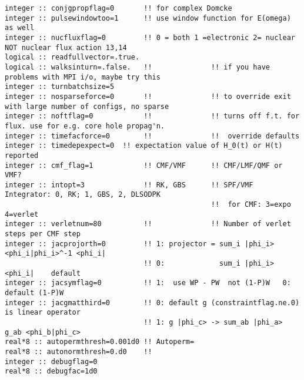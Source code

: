 \begin{verbatim}
integer :: conjgpropflag=0       !! for complex Domcke
integer :: pulsewindowtoo=1      !! use window function for E(omega) as well
integer :: nucfluxflag=0         !! 0 = both 1 =electronic 2= nuclear  NOT nuclear flux action 13,14
logical :: readfullvector=.true.
logical :: walksinturn=.false.   !!              !! if you have problems with MPI i/o, maybe try this
integer :: turnbatchsize=5
integer :: nosparseforce=0       !!              !! to override exit with large number of configs, no sparse
integer :: noftflag=0            !!              !! turns off f.t. for flux. use for e.g. core hole propag'n.
integer :: timefacforce=0        !!              !!  override defaults
integer :: timedepexpect=0  !! expectation value of H_0(t) or H(t) reported
integer :: cmf_flag=1            !! CMF/VMF      !! CMF/LMF/QMF or VMF?
integer :: intopt=3              !! RK, GBS      !! SPF/VMF Integrator: 0, RK; 1, GBS, 2, DLSODPK  
                                                 !!  for CMF: 3=expo 4=verlet
integer :: verletnum=80          !!              !! Number of verlet steps per CMF step
integer :: jacprojorth=0         !! 1: projector = sum_i |phi_i> <phi_i|phi_i>^-1 <phi_i|
                                 !! 0:             sum_i |phi_i> <phi_i|    default
integer :: jacsymflag=0          !! 1:  use WP - PW  not (1-P)W   0: default (1-P)W
integer :: jacgmatthird=0        !! 0: default g (constraintflag.ne.0) is linear operator
                                 !! 1: g |phi_c> -> sum_ab |phi_a> g_ab <phi_b|phi_c>
real*8 :: autopermthresh=0.001d0 !! Autoperm=
real*8 :: autonormthresh=0.d0    !! 
integer :: debugflag=0
real*8 :: debugfac=1d0
\end{verbatim}
